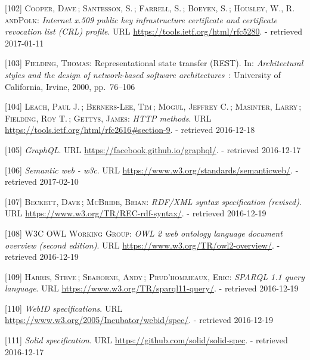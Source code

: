 \documentclass[12pt,english,a4paper,titlepage,cleardoublepage=empty,dottedtoc]{report}
\begin{document}
\hypertarget{ref-web_spec_x509}{}
{[}102{]} \textsc{Cooper, Dave}\,; \textsc{Santesson, S.}\,;
\textsc{Farrell, S.}\,; \textsc{Boeyen, S.}\,; \textsc{Housley, W.,
\textnormal{R. andPolk}}: \emph{Internet x.509 public key infrastructure
certificate and certificate revocation list (CRL) profile}. URL
\url{https://tools.ietf.org/html/rfc5280}. - retrieved 2017-01-11

\hypertarget{ref-web_spec_rest}{}
{[}103{]} \textsc{Fielding, Thomas}: Representational state transfer
(REST). In: \emph{Architectural styles and the design of network-based
software architectures}~: University of California, Irvine, 2000,
pp.~76--106

\hypertarget{ref-web_spec_http-methods}{}
{[}104{]} \textsc{Leach, Paul J.}\,; \textsc{Berners-Lee, Tim}\,;
\textsc{Mogul, Jeffrey C.}\,; \textsc{Masinter, Larry}\,;
\textsc{Fielding, Roy T.}\,; \textsc{Gettys, James}: \emph{HTTP
methods}. URL \url{https://tools.ietf.org/html/rfc2616\#section-9}. -
retrieved 2016-12-18

\hypertarget{ref-web_spec_graphql}{}
{[}105{]} \emph{GraphQL}. URL \url{https://facebook.github.io/graphql/}.
- retrieved 2016-12-17

\hypertarget{ref-web_2016_w3c_semantic-web-activity}{}
{[}106{]} \emph{Semantic web - w3c}. URL
\url{https://www.w3.org/standards/semanticweb/}. - retrieved 2017-02-10

\hypertarget{ref-web_w3c-tr_rdf}{}
{[}107{]} \textsc{Beckett, Dave}\,; \textsc{McBride, Brian}:
\emph{RDF/XML syntax specification (revised)}. URL
\url{https://www.w3.org/TR/REC-rdf-syntax/}. - retrieved 2016-12-19

\hypertarget{ref-web_w3c-tr_owl}{}
{[}108{]} \textsc{W3C OWL Working Group}: \emph{OWL 2 web ontology
language document overview (second edition)}. URL
\url{https://www.w3.org/TR/owl2-overview/}. - retrieved 2016-12-19

\hypertarget{ref-web_w3c-tr_sparql}{}
{[}109{]} \textsc{Harris, Steve}\,; \textsc{Seaborne, Andy}\,;
\textsc{Prud'hommeaux, Eric}: \emph{SPARQL 1.1 query language}. URL
\url{https://www.w3.org/TR/sparql11-query/}. - retrieved 2016-12-19

\hypertarget{ref-web_w3c-draft_webid}{}
{[}110{]} \emph{WebID specifications}. URL
\url{https://www.w3.org/2005/Incubator/webid/spec/}. - retrieved
2016-12-19

\hypertarget{ref-web_spec_solid}{}
{[}111{]} \emph{Solid specification}. URL
\url{https://github.com/solid/solid-spec}. - retrieved 2016-12-17
\end{document}
